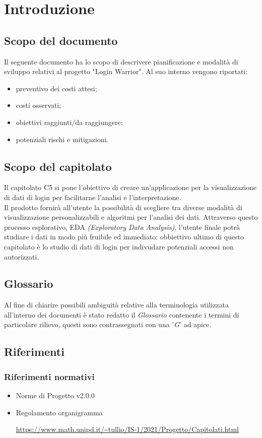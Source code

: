 \section{Introduzione}
\subsection{Scopo del documento}
Il seguente documento ha lo scopo di descrivere pianificazione e modalità di sviluppo relativi al progetto "Login Warrior".
Al suo interno vengono riportati:
\begin{itemize}
    \item preventivo dei costi attesi;
    \item costi osservati;
    \item obiettivi raggiunti/da raggiungere;
    \item potenziali rischi e mitigazioni.
\end{itemize} 

\subsection{Scopo del capitolato}
Il capitolato C5 si pone l'obiettivo di creare un'applicazione per la visualizzazione di dati di login 
per facilitarne l'analisi e l'interpretazione.\\ 
Il prodotto fornirà all'utente la possibilità di scegliere tra diverse
modalità di visualizzazione personalizzabili e algoritmi per l'analisi dei dati. 
Attraverso questo processo esplorativo, EDA \textit{(Exploratory Data Analysis)},
l'utente finale potrà studiare i dati in modo più fruibile ed immediato: obbiettivo ultimo 
di questo capitolato è lo studio di dati di login per indivudare potenziali accessi non autorizzati.

\subsection{Glossario}
Al fine di chiarire possibili ambiguità relative alla terminologia utilizzata all'interno dei documenti è stato redatto il \textit{Glossario} contenente i termini di particolare rilievo,
questi sono contrassegnati con una '\textit{G}' ad apice. 

\subsection{Riferimenti}
\subsubsection{Riferimenti normativi}
\begin{itemize}
    \item Norme di Progetto v2.0.0
    \item Regolamento organigramma \par \url{https://www.math.unipd.it/~tullio/IS-1/2021/Progetto/Capitolati.html}
\end{itemize}
